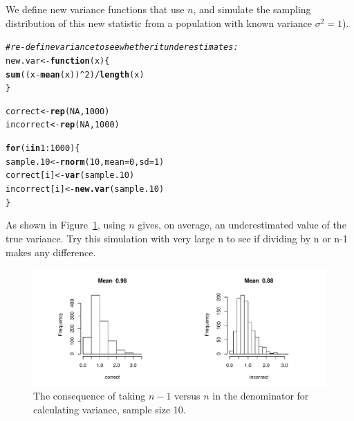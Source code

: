\documentclass[12pt]{book}\usepackage[]{graphicx}\usepackage[]{color}
\makeatletter
\def\maxwidth{ %
  \ifdim\Gin@nat@width>\linewidth
    \linewidth
  \else
    \Gin@nat@width
  \fi
}
\newcommand{\hlnum}[1]{\textcolor[rgb]{0.686,0.059,0.569}{#1}}%
\newcommand{\hlcom}[1]{\textcolor[rgb]{0.678,0.584,0.686}{\textit{#1}}}%
\newcommand{\hlopt}[1]{\textcolor[rgb]{0,0,0}{#1}}%
\newcommand{\hlstd}[1]{\textcolor[rgb]{0.345,0.345,0.345}{#1}}%
\newcommand{\hlkwa}[1]{\textcolor[rgb]{0.161,0.373,0.58}{\textbf{#1}}}%
\newcommand{\hlkwb}[1]{\textcolor[rgb]{0.69,0.353,0.396}{#1}}%
\newcommand{\hlkwc}[1]{\textcolor[rgb]{0.333,0.667,0.333}{#1}}%
\newcommand{\hlkwd}[1]{\textcolor[rgb]{0.737,0.353,0.396}{\textbf{#1}}}%
\newenvironment{kframe}{%
 \def\at@end@of@kframe{}%
 \ifinner\ifhmode%
  \def\at@end@of@kframe{\end{minipage}}%
  \begin{minipage}{\columnwidth}%
 \fi\fi%
 \def\FrameCommand##1{\hskip\@totalleftmargin \hskip-\fboxsep
 \colorbox{shadecolor}{##1}\hskip-\fboxsep
     \hskip-\linewidth \hskip-\@totalleftmargin \hskip\columnwidth}%
 \MakeFramed {\advance\hsize-\width
   \@totalleftmargin\z@ \linewidth\hsize
   \@setminipage}}%
 {\par\unskip\endMakeFramed%
 \at@end@of@kframe}
\newenvironment{knitrout}{}{} %
\makeatother
\begin{document}
We define new variance functions that use $n$, and simulate the sampling distribution of this new statistic from a population with known variance $\sigma^2=1$).
\begin{knitrout}
\color{fgcolor}\begin{kframe}
\begin{alltt}
\hlcom{# re-define variance to see whether it underestimates:}
\hlstd{new.var} \hlkwb{<-} \hlkwa{function}\hlstd{(}\hlkwc{x}\hlstd{)\{}
        \hlkwd{sum}\hlstd{((x}\hlopt{-}\hlkwd{mean}\hlstd{(x))}\hlopt{^}\hlnum{2}\hlstd{)} \hlopt{/} \hlkwd{length}\hlstd{(x)}
\hlstd{\}}

\hlstd{correct} \hlkwb{<-} \hlkwd{rep}\hlstd{(}\hlnum{NA}\hlstd{,}\hlnum{1000}\hlstd{)}
\hlstd{incorrect} \hlkwb{<-} \hlkwd{rep}\hlstd{(}\hlnum{NA}\hlstd{,}\hlnum{1000}\hlstd{)}

\hlkwa{for}\hlstd{(i} \hlkwa{in} \hlnum{1}\hlopt{:}\hlnum{1000}\hlstd{)\{}
  \hlstd{sample.10} \hlkwb{<-} \hlkwd{rnorm}\hlstd{(}\hlnum{10}\hlstd{,} \hlkwc{mean}\hlstd{=}\hlnum{0}\hlstd{,} \hlkwc{sd}\hlstd{=}\hlnum{1}\hlstd{)}
  \hlstd{correct[i]} \hlkwb{<-} \hlkwd{var}\hlstd{(sample.10)}
  \hlstd{incorrect[i]} \hlkwb{<-} \hlkwd{new.var}\hlstd{(sample.10)}
\hlstd{\}}
\end{alltt}
\end{kframe}
\end{knitrout}

As shown in Figure~\ref{fig:nminus1}, 
using $n$ gives, on average, an underestimated value of the true
variance. Try this simulation with very large n to see if dividing by n or n-1 makes any difference.




\begin{figure}[!htbp]
  \centering
\begin{knitrout}
\color{fgcolor}
\includegraphics[width=\maxwidth]{figure/unnamed-chunk-38-1} 

\end{knitrout}
\caption{The consequence of taking $n-1$ versus $n$ in the
denominator for calculating variance, sample size 10.}
\label{fig:nminus1}
\end{figure}
\end{document}
